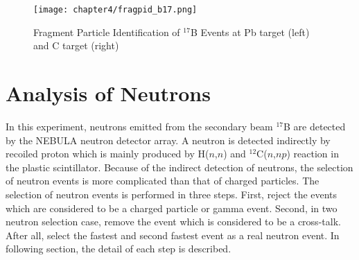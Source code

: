 \begin{figure}
    \centering
    \texttt{[image: chapter4/fragpid\_b17.png]}
    \caption[Fragment Particle Identification from ${}^{17}$B Beam]{Fragment Particle Identification of ${}^{17}$B Events at Pb target (left) and C target (right)}
    \label{fig:fragpid_b17}
\end{figure}

\clearpage

\section{Analysis of Neutrons}
In this experiment, neutrons emitted from the secondary beam ${}^{17}$B are detected by the NEBULA neutron detector array. A neutron is detected indirectly by recoiled proton which is mainly produced by H($n$,$n$) and ${}^{12}$C($n$,$np$) reaction in the plastic scintillator. Because of the indirect detection of neutrons, the selection of neutron events is more complicated than that of charged particles. The selection of neutron events is performed in three steps. First, reject the events which are considered to be a charged particle or gamma event. Second, in two neutron selection case, remove the event which is considered to be a cross-talk. After all, select the fastest and second fastest event as a real neutron event. In following section, the detail of each step is described.

